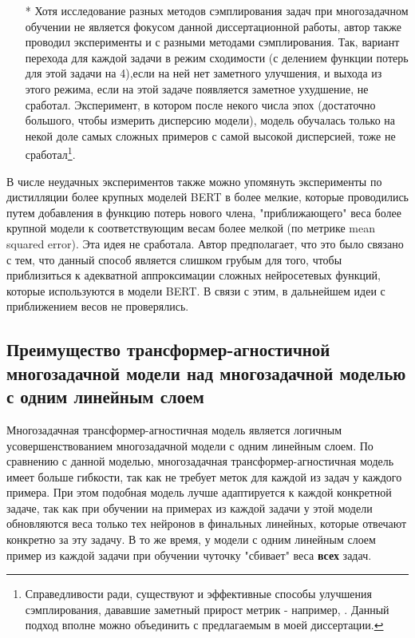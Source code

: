 \begin{itemize}
\item[*] Хотя исследование разных методов сэмплирования задач при многозадачном обучении не является фокусом данной диссертационной работы, автор также проводил эксперименты и с разными методами сэмплирования. Так, вариант перехода для каждой задачи в режим сходимости (с делением функции потерь для этой задачи на 4),если на ней нет заметного улучшения, и выхода из этого режима, если на этой задаче появляется заметное ухудшение, не сработал. Эксперимент, в котором после некого числа эпох (достаточно большого, чтобы измерить дисперсию модели), модель обучалась только на некой доле самых сложных примеров с самой высокой дисперсией, тоже не сработал\footnote{Справедливости ради, существуют и эффективные способы улучшения сэмплирования, дававшие заметный прирост метрик - например, \cite{GradTS}. Данный подход вполне можно объединить с предлагаемым в моей диссертации.}. 
\end{itemize}

В числе неудачных экспериментов также можно упомянуть эксперименты по дистилляции более крупных моделей BERT в более мелкие, которые проводились путем добавления в функцию потерь нового члена, "приближающего" веса более крупной модели к соответствующим весам более мелкой (по метрике mean squared error). Эта идея не сработала. Автор предполагает, что это было связано с тем, что данный способ является слишком грубым для того, чтобы приблизиться к адекватной аппроксимации сложных нейросетевых функций, которые используются в модели BERT. В связи с этим, в дальнейшем идеи с приближением весов не проверялись. 
\subsection{Преимущество трансформер-агностичной многозадачной модели над многозадачной моделью с одним линейным слоем} 
\label{ch:tr-ag:advantages}

Многозадачная трансформер-агностичная модель является логичным усовершенствованием многозадачной модели с одним линейным слоем. По сравнению с данной моделью, многозадачная трансформер-агностичная модель имеет больше гибкости, так как не требует меток для каждой из задач у каждого примера. При этом подобная модель лучше адаптируется к каждой конкретной задаче, так как при обучении на примерах из каждой задачи у этой модели обновляются веса только тех нейронов в финальных линейных, которые отвечают конкретно за эту задачу. В то же время, у модели с одним линейным слоем пример из каждой задачи при обучении чуточку "сбивает" веса \textbf{всех} задач. 

